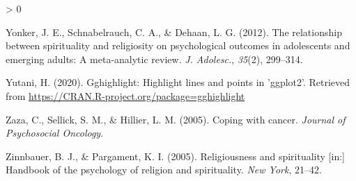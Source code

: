 \documentclass[
  english,
  man,floatsintext]{apa6}
\newlength{\cslhangindent}
\newenvironment{CSLReferences}[2] %
 {%
  \setlength{\parindent}{0pt}
  \ifodd #1 \everypar{\setlength{\hangindent}{\cslhangindent}}\ignorespaces\fi
  \ifnum #2 > 0
  \setlength{\parskip}{#2\baselineskip}
  \fi
 }%
 {}
\begin{document}
\begin{CSLReferences}{1}{0}
\leavevmode\hypertarget{ref-Yonker2012-zg}{}%
Yonker, J. E., Schnabelrauch, C. A., \& Dehaan, L. G. (2012). The relationship between spirituality and religiosity on psychological outcomes in adolescents and emerging adults: A meta-analytic review. \emph{J. Adolesc.}, \emph{35}(2), 299--314.

\leavevmode\hypertarget{ref-R-gghighlight}{}%
Yutani, H. (2020). Gghighlight: Highlight lines and points in 'ggplot2'. Retrieved from \url{https://CRAN.R-project.org/package=gghighlight}

\leavevmode\hypertarget{ref-Zaza2005-ac}{}%
Zaza, C., Sellick, S. M., \& Hillier, L. M. (2005). Coping with cancer. \emph{Journal of Psychosocial Oncology}.

\leavevmode\hypertarget{ref-Zinnbauer2005-vz}{}%
Zinnbauer, B. J., \& Pargament, K. I. (2005). Religiousness and spirituality {[}in:{]} Handbook of the psychology of religion and spirituality. \emph{New York}, 21--42.

\end{CSLReferences}

\endgroup
\end{document}
